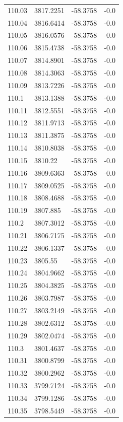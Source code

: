 \begin{table}[H]
\begin{tabular}{llll}
110.03 & 3817.2251 & -58.3758 & -0.0 \\
110.04 & 3816.6414 & -58.3758 & -0.0 \\
110.05 & 3816.0576 & -58.3758 & -0.0 \\
110.06 & 3815.4738 & -58.3758 & -0.0 \\
110.07 & 3814.8901 & -58.3758 & -0.0 \\
110.08 & 3814.3063 & -58.3758 & -0.0 \\
110.09 & 3813.7226 & -58.3758 & -0.0 \\
110.1 & 3813.1388 & -58.3758 & -0.0 \\
110.11 & 3812.5551 & -58.3758 & -0.0 \\
110.12 & 3811.9713 & -58.3758 & -0.0 \\
110.13 & 3811.3875 & -58.3758 & -0.0 \\
110.14 & 3810.8038 & -58.3758 & -0.0 \\
110.15 & 3810.22 & -58.3758 & -0.0 \\
110.16 & 3809.6363 & -58.3758 & -0.0 \\
110.17 & 3809.0525 & -58.3758 & -0.0 \\
110.18 & 3808.4688 & -58.3758 & -0.0 \\
110.19 & 3807.885 & -58.3758 & -0.0 \\
110.2 & 3807.3012 & -58.3758 & -0.0 \\
110.21 & 3806.7175 & -58.3758 & -0.0 \\
110.22 & 3806.1337 & -58.3758 & -0.0 \\
110.23 & 3805.55 & -58.3758 & -0.0 \\
110.24 & 3804.9662 & -58.3758 & -0.0 \\
110.25 & 3804.3825 & -58.3758 & -0.0 \\
110.26 & 3803.7987 & -58.3758 & -0.0 \\
110.27 & 3803.2149 & -58.3758 & -0.0 \\
110.28 & 3802.6312 & -58.3758 & -0.0 \\
110.29 & 3802.0474 & -58.3758 & -0.0 \\
110.3 & 3801.4637 & -58.3758 & -0.0 \\
110.31 & 3800.8799 & -58.3758 & -0.0 \\
110.32 & 3800.2962 & -58.3758 & -0.0 \\
110.33 & 3799.7124 & -58.3758 & -0.0 \\
110.34 & 3799.1286 & -58.3758 & -0.0 \\
110.35 & 3798.5449 & -58.3758 & -0.0 \\

\end{tabular}
\end{table}
